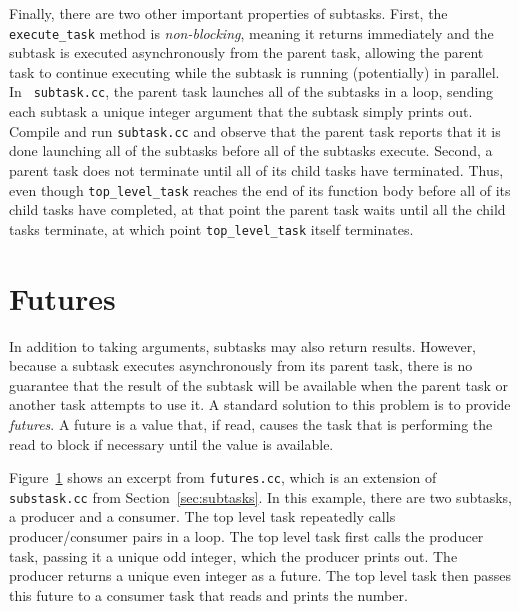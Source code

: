 Finally, there are two other important properties of subtasks.  First,
the {\tt execute\_task} method is {\em non-blocking}, meaning it
returns immediately and the subtask is executed asynchronously from
the parent task, allowing the parent task to continue executing while
the subtask is running (potentially) in parallel.  In {\tt
  subtask.cc}, the parent task launches all of the subtasks in a loop,
sending each subtask a unique integer argument that the subtask simply prints
out.  Compile and run {\tt subtask.cc} and observe that the
parent task reports that it is done launching all of the subtasks
before all of the subtasks execute.  Second, a parent task does not
terminate until all of its child tasks have terminated.  Thus, even
though {\tt top\_level\_task} reaches the end of its function body
before all of its child tasks have completed, at that point the parent
task waits until all the child tasks terminate, at which point
{\tt top\_level\_task} itself terminates.

\section{Futures}
\label{sec:futures}

\begin{figure}

\caption{}
\label{fig:futures}
\end{figure}

In addition to taking arguments, subtasks may also return results.
However, because a subtask executes asynchronously from its parent
task, there is no guarantee that the result of the subtask will be
available when the parent task or another task attempts to use it.  A
standard solution to this problem is to provide {\em futures}.  A future
is a value that, if read, causes the task that is performing the
read to block if necessary until the value is available.

Figure~\ref{fig:futures} shows an excerpt from {\tt futures.cc}, which
is an extension of {\tt substask.cc} from
Section~\ref{sec:subtasks}.  In this example, there are two subtasks,
a producer and a consumer.  The top level task repeatedly calls
\mbox{producer/consumer} pairs in a loop.  The top level task first calls the
producer task, passing it a unique odd integer, which the producer
prints out.  The producer returns a unique even integer as a future.
The top level task then passes this future to a consumer task that
reads and prints the number.

